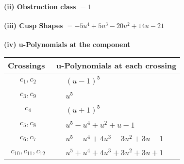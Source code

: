 \documentclass[1p]{elsarticle_modified}
\theoremstyle{definition}
\begin{document}
\flushleft \textbf{(ii) Obstruction class $= 1$}\\~\\
\flushleft \textbf{(iii) Cusp Shapes $= -5 u^4+5 u^3-20 u^2+14 u-21$}\\~\\
\newpage\renewcommand{\arraystretch}{1}
\flushleft \textbf{(iv) u-Polynomials at the component}\newline \\
\begin{tabular}{m{50pt}|m{274pt}}
Crossings & \hspace{64pt}u-Polynomials at each crossing \\
\hline $$\begin{aligned}c_{1},c_{2}\end{aligned}$$&$\begin{aligned}
&(u-1)^5
\end{aligned}$\\
\hline $$\begin{aligned}c_{3},c_{9}\end{aligned}$$&$\begin{aligned}
&u^5
\end{aligned}$\\
\hline $$\begin{aligned}c_{4}\end{aligned}$$&$\begin{aligned}
&(u+1)^5
\end{aligned}$\\
\hline $$\begin{aligned}c_{5},c_{8}\end{aligned}$$&$\begin{aligned}
&u^5- u^4+u^2+u-1
\end{aligned}$\\
\hline $$\begin{aligned}c_{6},c_{7}\end{aligned}$$&$\begin{aligned}
&u^5- u^4+4 u^3-3 u^2+3 u-1
\end{aligned}$\\
\hline $$\begin{aligned}c_{10},c_{11},c_{12}\end{aligned}$$&$\begin{aligned}
&u^5+u^4+4 u^3+3 u^2+3 u+1
\end{aligned}$\\
\hline
\end{tabular}\\~\\
\end{document}
